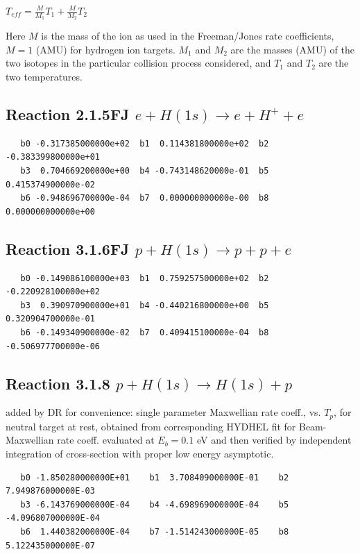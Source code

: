 \documentclass[12pt,dvipdfmx]{article}
\begin{document}
$T_{eff} = \frac {M}{M_1} T_1 + \frac{M}{M_2} T_2 $

Here $M$ is the mass of the ion as used in the Freeman/Jones rate coefficients,
$M=1$ (AMU) for hydrogen ion targets.
$M_1$ and $M_2$ are the masses (AMU) of the two isotopes in the particular collision
process considered, and $T_1$ and $T_2$ are the two temperatures.

\bigskip

\subsection{
Reaction 2.1.5FJ  $e + H(1s) \rightarrow e + H^+ + e$
}


\begin{small}\begin{verbatim}
   b0 -0.317385000000e+02  b1  0.114381800000e+02  b2 -0.383399800000e+01
   b3  0.704669200000e+00  b4 -0.743148620000e-01  b5  0.415374900000e-02
   b6 -0.948696700000e-04  b7  0.000000000000e-00  b8  0.000000000000e+00
\end{verbatim}\end{small}

\subsection{
Reaction 3.1.6FJ  $p + H(1s) \rightarrow p + p + e $
}

\begin{small}\begin{verbatim}
   b0 -0.149086100000e+03  b1  0.759257500000e+02  b2 -0.220928100000e+02
   b3  0.390970900000e+01  b4 -0.440216800000e+00  b5  0.320904700000e-01
   b6 -0.149340900000e-02  b7  0.409415100000e-04  b8 -0.506977700000e-06
\end{verbatim}\end{small}

\subsection{
Reaction 3.1.8 $  p + H(1s) \rightarrow H(1s) + p$}

added by DR for convenience: single parameter Maxwellian rate coeff., vs. $T_p$, for neutral target at rest,
obtained from corresponding HYDHEL fit for Beam-Maxwellian rate coeff. evaluated at $E_b =0.1$ eV
and then verified by independent integration of cross-section with proper low energy asymptotic.

\begin{small}\begin{verbatim}
   b0 -1.850280000000E+01    b1  3.708409000000E-01    b2  7.949876000000E-03
   b3 -6.143769000000E-04    b4 -4.698969000000E-04    b5 -4.096807000000E-04
   b6  1.440382000000E-04    b7 -1.514243000000E-05    b8  5.122435000000E-07
\end{verbatim}\end{small}
\end{document}
